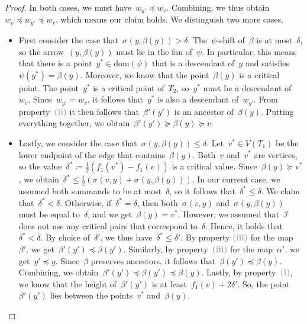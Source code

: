 \documentclass[11pt]{article}
\newcommand{\dom}{\mathrm{dom}}
\newcommand{\shift}[1]{\sigma_{#1}}
\newcommand{\I}{\mathcal{I}}
\newcommand{\enumit}[1]{\textcolor{darkgray}{\sffamily\bfseries\upshape\mathversion{bold}#1}}
\begin{document}
\begin{proof}
    In both cases, we must have~$w_{y'} \preceq w_v$.
    Combining, we thus obtain~$w_v \preceq w_{y'} \preceq w_v$, which means our claim holds.
    We distinguish two more cases.
%
	\begin{itemize}
		\item 
			First consider the case that~$\shift{}(y, \beta(y)) > \delta$.
            The~$\psi$-shift of~$\beta$ is at most~$\delta$, so the arrow~$(y, \beta(y))$ must lie in the fan of~$\psi$.
            In particular, this means that there is a point~$y^* \in \dom(\psi)$ that is a descendant of~$y$ and satisfies~$\psi(y^*) = \beta(y)$.
            Moreover, we know that the point~$\beta(y)$ is a critical point.
            The point~$y^*$ is a critical point of~$T_2$, so~$y^*$ must be a descendant of~$w_v$.
            Since~$w_{y'} = w_v$, it follows that~$y^*$ is also a descendant of~$w_{y'}$.
            From property~\enumit{(ii)} it then follows that~$\beta'(y')$ is an ancestor of~$\beta(y)$.
            Putting everything together, we obtain~$\beta'(y') \succeq \beta(y) \succeq v$.
		\item
			Lastly, we consider the case that~$\shift{}(y, \beta(y)) \le \delta$.
            Let~$v^* \in V(T_1)$ be the lower endpoint of the edge that contains~$\beta(y)$.
			Both~$v$ and~$v^*$ are vertices, so the value~$\delta^* \coloneqq \tfrac{1}{2}(f_1(v^*) - f_1(v))$ is a critical value.
            Since~$\beta(y) \succeq v^*$, we obtain~$\delta^* \le \tfrac{1}{2}(\shift{}(v, y) + \shift{}(y, \beta(y)))$.
			In our current case, we assumed both summands to be at most~$\delta$, so it follows that~$\delta^* \le \delta$.
            We claim that~$\delta^* < \delta$.
            Otherwise, if~$\delta^* = \delta$, then both~$\shift{}(v, y)$ and~$\shift{}(y, \beta(y))$ must be equal to~$\delta$, and we get~$\beta(y) = v^*$.
            However, we assumed that~$\I$ does not use any critical pairs that correspond to~$\delta$.
            Hence, it holds that~$\delta^* < \delta$.
			By choice of~$\delta'$, we thus have~$\delta^* \le \delta'$.
			By property \enumit{(iii)} for the map~$\beta'$, we get~$\beta'(y') \preceq \beta(y')$.
            Similarly, by property~\enumit{(iii)} for the map~$\alpha'$, we get~$y' \preceq y$.
            Since~$\beta$ preserves ancestors, it follows that~$\beta(y') \preceq \beta(y)$.
            Combining, we obtain~$\beta'(y') \preceq \beta(y') \preceq \beta(y)$.
			Lastly, by property~\enumit{(i)}, we know that the height of~$\beta'(y')$ is at least~$f_1(v) + 2\delta'$.
			So, the point~$\beta'(y')$ lies between the points~$v^*$ and~$\beta(y)$.

\end{itemize}
\end{proof}
\end{document}
